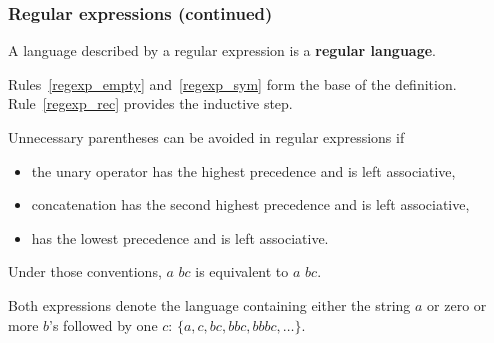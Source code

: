 % 
\begin{frame}
\frametitle{Regular expressions (continued)}

A language described by a regular expression is a \textbf{regular
language}.

\bigskip

Rules~\ref{regexp_empty} and~\ref{regexp_sym} form the base of the
definition. Rule~\ref{regexp_rec} provides the inductive step.

\bigskip

Unnecessary parentheses can be avoided in regular expressions if
\begin{itemize}

  \item the unary operator \kleene{} has the highest precedence and
  is left associative,

  \item concatenation has the second highest precedence and is left
  associative,

  \item \disj{} has the lowest precedence and is left associative.

\end{itemize}
Under those conventions, \lparen\(a\)\rparen{} \disj
\lparen\lparen\(b\)\rparen\kleene\lparen\(c\)\rparen\rparen{} is
equivalent to \(a\) \disj \(b\)\kleene\(c\).

\bigskip

Both expressions denote the language containing either the string
\(a\) or zero or more \(b\)'s followed by one \(c\): \(\{a, c, bc,
bbc, bbbc, \dots\}\).

\end{frame}

